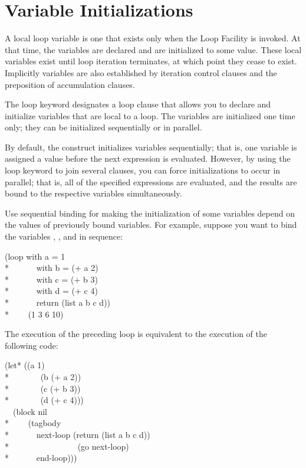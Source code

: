 \section{Variable Initializations}
\label{LOOP-VAR-SECTION}

A local loop variable is one that exists only when the Loop Facility
is invoked.  At that time, the variables are declared and are
initialized to some value.  These local variables exist until loop
iteration terminates, at which point they cease to exist.  Implicitly
variables are also established by iteration control clauses and the
 preposition of accumulation clauses.


The loop keyword  designates a loop clause that allows you to 
declare and initialize variables
that are local to a loop.  The variables are initialized one time
only; they can be initialized sequentially or in parallel.

By default, the  construct initializes variables
sequentially; that is, one variable is assigned a value before the
next expression is evaluated.  However, by using the loop keyword 
 to join several  clauses, you can force
initializations to occur in parallel; that is, all of the specified
expressions are evaluated, and the results are bound to the respective
variables simultaneously.

Use sequential binding for making the initialization of
some variables depend on the values of previously bound variables.
For example, suppose you want to bind the variables , ,
and  in sequence:
\begin{lisp}
(loop with a = 1  \\*
~~~~~~with b = (+ a 2)  \\*
~~~~~~with c = (+ b 3) \\*
~~~~~~with d = (+ c 4) \\*
~~~~~~return (list a b c d)) \\*
~~~\EV~(1 3 6 10)
\end{lisp}

The execution of the preceding loop is equivalent to the execution of
the following code:
\begin{lisp}
(let* ((a 1) \\*
~~~~~~~(b (+ a 2)) \\*
~~~~~~~(c (+ b 3)) \\*
~~~~~~~(d (+ c 4))) \\
~~(block nil \\*
~~~~(tagbody \\*
~~~~~~next-loop (return (list a b c d)) \\*
~~~~~~~~~~~~~~~~(go next-loop) \\*
~~~~~~end-loop)))
\end{lisp}


